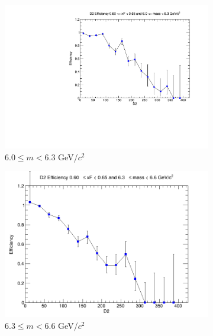 \begin{figure}[p]
\begin{subfigure}[b]{0.32\textwidth}
        \includegraphics[width=\textwidth]{./kTrackerEfficiencyPlots/D2_Efficiency_xF12_mass6.pdf}
        \caption{$6.0 \leq m < 6.3$ GeV/$c^2$}
        \label{fig:xF12_mass6}
    \end{subfigure}
    \hfill
    \begin{subfigure}[b]{0.32\textwidth}
        \centering
        \includegraphics[width=\textwidth]{./kTrackerEfficiencyPlots/D2_Efficiency_xF12_mass7.png}
        \caption{$6.3 \leq m < 6.6$ GeV/$c^2$}
        \label{fig:xF12_mass7}
    \end{subfigure}
    \hfill
    \begin{subfigure}[b]{0.32\textwidth}
        \centering

\end{subfigure}
\end{figure}
